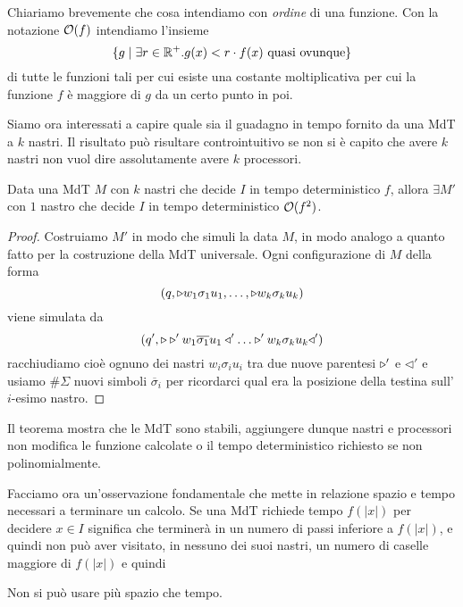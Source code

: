 Chiariamo brevemente che cosa intendiamo con \emph{ordine} di
una funzione. Con la notazione $\mathcal{O}(f)$ intendiamo l'insieme
\[
	\{ g \mid \exists r \in \mathbb{R}^+ . g(x) < r \cdot f(x)
	\text{ quasi ovunque} \}
\]
di tutte le funzioni tali per cui esiste una costante
moltiplicativa per cui la funzione $f$ è maggiore di $g$
da un certo punto in poi.

Siamo ora interessati a capire quale sia il guadagno in tempo
fornito da una MdT a $k$ nastri. Il risultato può risultare
controintuitivo se non si è capito che avere $k$ nastri non
vuol dire assolutamente avere $k$ processori.

\begin{theorem} \label{th: red_nastri}
	Data una MdT $M$ con $k$ nastri che decide $I$ in tempo
	deterministico $f$, allora $\exists M'$ con $1$ nastro che
	decide $I$ in tempo deterministico $\mathcal{O} (f^2)$.
	\begin{proof}
		Costruiamo $M'$ in modo che simuli la data $M$, in modo
		analogo a quanto fatto per la costruzione della MdT
		universale. Ogni configurazione di $M$ della forma
		\[
			(q, \triangleright w_1 \sigma_1 u_1, \dots,
			\triangleright w_k \sigma_k u_k )
		\]
		viene simulata da
		\[
			(q', \start \start' w_1 \overline{\sigma_1} u_1
			\triangleleft' \dots
			\start' w_k \sigma_k u_k \triangleleft')
		\]
		racchiudiamo cioè ognuno dei nastri $w_i \sigma_i u_i$
		tra due nuove parentesi $\triangleright'$ e $\triangleleft'$ e
		usiamo $\# \Sigma$ nuovi simboli $\overline{\sigma}_i$
		per ricordarci qual era la posizione della testina
		sull'$i$-esimo nastro.

	\end{proof}
\end{theorem}

Il teorema mostra che le MdT sono stabili, aggiungere dunque
nastri e processori non modifica le funzione calcolate o il
tempo deterministico richiesto se non polinomialmente.

Facciamo ora un'osservazione fondamentale che mette in relazione
spazio e tempo necessari a terminare un calcolo. Se una MdT
richiede tempo $f(|x|)$ per decidere $x \in I$ significa che
terminerà in un numero di passi inferiore a $f(|x|)$, e quindi
non può aver visitato, in nessuno dei suoi nastri, un numero di
caselle maggiore di $f(|x|)$ e quindi

\begin{observation}
	Non si può usare più spazio che tempo.
\end{observation}

